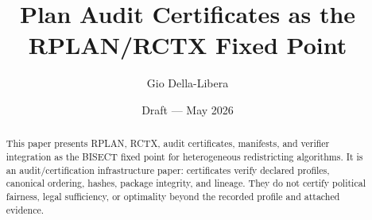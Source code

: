 \documentclass[12pt]{article}
\title{Plan Audit Certificates as the RPLAN/RCTX Fixed Point}
\author{Gio Della-Libera}
\date{Draft --- May 2026}
\begin{document}
\maketitle

\begin{abstract}
This paper presents RPLAN, RCTX, audit certificates, manifests, and verifier
integration as the BISECT fixed point for heterogeneous redistricting
algorithms. It is an audit/certification infrastructure paper: certificates
verify declared profiles, canonical ordering, hashes, package integrity, and
lineage. They do not certify political fairness, legal sufficiency, or
optimality beyond the recorded profile and attached evidence.
\end{abstract}








\nocite{bisect-u20-plan}


\end{document}
